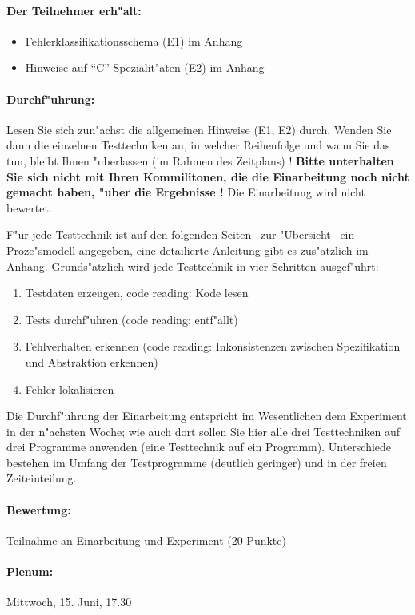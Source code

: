 \paragraph{Der Teilnehmer erh"alt:}  
\begin{itemize}
	\item Fehlerklassifikationsschema (E1) im Anhang
	\item Hinweise auf "`C"' Spezialit"aten (E2) im Anhang
\end{itemize}

\paragraph{Durchf"uhrung:} 
Lesen Sie sich zun"achst die allgemeinen Hinweise (E1, E2) durch.
Wenden Sie dann die einzelnen Testtechniken an, in welcher Reihenfolge
und wann Sie das tun, bleibt Ihnen "uberlassen (im Rahmen des Zeitplans) ! 
{\bf Bitte unterhalten Sie
sich nicht mit Ihren Kommilitonen, die die Einarbeitung noch nicht gemacht 
haben, "uber die Ergebnisse !} Die Einarbeitung wird nicht bewertet.
\bigskip

F"ur jede Testtechnik ist auf den folgenden Seiten --zur "Ubersicht--
ein Proze"smodell angegeben, eine detailierte Anleitung gibt es 
zus"atzlich im Anhang. Grunds"atzlich wird jede Testtechnik in vier
Schritten ausgef"uhrt:
\begin{enumerate}
	\item Testdaten erzeugen, code reading: Kode lesen
	\item Tests durchf"uhren (code reading: entf"allt)
	\item Fehlverhalten erkennen (code reading: Inkonsistenzen zwischen 
		Spezifikation und Abstraktion erkennen)
	\item Fehler lokalisieren
\end{enumerate}

Die Durchf"uhrung der Einarbeitung entspricht im Wesentlichen 
dem Experiment in der n"achsten Woche; wie auch dort sollen Sie hier alle 
drei Testtechniken auf drei
Programme anwenden (eine Testtechnik auf ein Programm). Unterschiede 
bestehen im Umfang der Testprogramme (deutlich geringer) und
in der freien Zeiteinteilung.

\paragraph{Bewertung:} 
	Teilnahme an Einarbeitung und Experiment (20 Punkte)

\paragraph{Plenum:} Mittwoch, 15. Juni, 17.30

